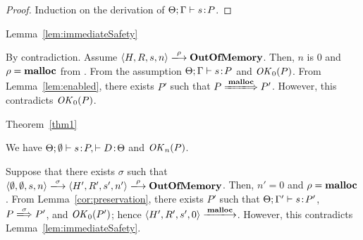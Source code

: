 \begin{proof}
Induction on the derivation of \(\Theta; \Gamma \vdash s \!:\! P\).
\end{proof}

\begin{pfof}{Lemma~\ref{lem:immediateSafety}}

By contradiction.  Assume \(\langle H, R, s, n \rangle
\xlongrightarrow{\rho} \OVERFLOW\). Then, \(n\) is \(0\) and \(\rho =
\mathbf{malloc}\) from .  From the assumption \(\Theta;\Gamma
\vdash s \!:\! P\) and \(\mathit{OK}_0(P)\).  From Lemma~\ref{lem:enabled},
there exists \(P'\) such that \(P \xLongrightarrow{\Malloc} P'\).
However, this contradicts \(\mathit{OK}_0(P)\).


\end{pfof}


\begin{pfof}{Theorem~\ref{thm1}}

We have \(\Theta;\emptyset \vdash s\!:\! P, \vdash D\!:\! \Theta\) and
\(\mathit{OK}_n(P)\).

Suppose that there exists \(\sigma\) such that \(\langle \emptyset,
\emptyset, s, n\rangle \xlongrightarrow{\sigma} \langle H', R', s',
n'\rangle \xlongrightarrow{\rho} \OVERFLOW\).  Then, \(n' = 0\) and
\(\rho = \mathbf{malloc}\).  From Lemma~\ref{cor:preservation}, there exists
\(P'\) such that \(\Theta; \Gamma' \vdash s \!:\! P'\), \(P
\xLongrightarrow{\sigma} P'\), and \(\mathit{OK}_0(P')\); hence \(\langle H',
R', s', 0\rangle \xlongrightarrow{\Malloc}\).  However, this
contradicts Lemma~\ref{lem:immediateSafety}.

\end{pfof}
